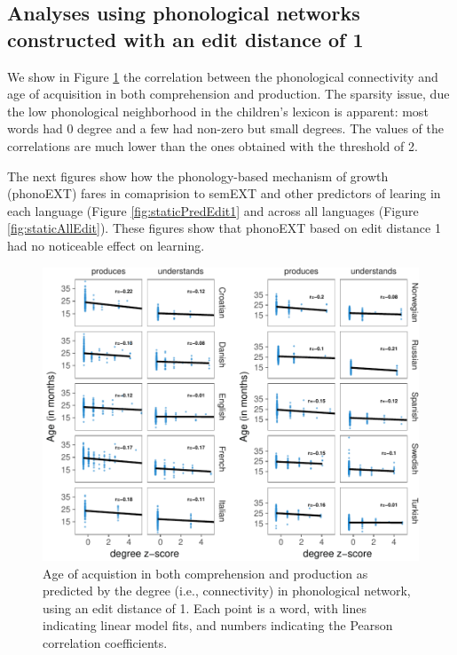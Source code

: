 \documentclass[english,floatsintext,man]{apa6}
\theoremstyle{definition}
\theoremstyle{definition}
\theoremstyle{definition}
\theoremstyle{remark}
\begin{document}
\subsection{Analyses using phonological networks constructed with an
edit distance of
1}\label{analyses-using-phonological-networks-constructed-with-an-edit-distance-of-1}

We show in Figure \ref{fig:corrPlot} the correlation between the
phonological connectivity and age of acquisition in both comprehension
and production. The sparsity issue, due the low phonological
neighborhood in the children's lexicon is apparent: most words had 0
degree and a few had non-zero but small degrees. The values of the
correlations are much lower than the ones obtained with the threshold of
2.

The next figures show how the phonology-based mechanism of growth
(phonoEXT) fares in comaprision to semEXT and other predictors of
learing in each language (Figure \ref{fig:staticPredEdit1} and across
all languages (Figure \ref{fig:staticAllEdit}). These figures show that
phonoEXT based on edit distance 1 had no noticeable effect on learning.

\begin{figure}[!h]
\includegraphics[width=\textwidth]{ms_files/figure-latex/corrPlot-1} \caption{Age of acquistion in both comprehension and production as predicted by the degree (i.e., connectivity) in phonological network, using an edit distance of 1. Each point is a word, with lines indicating linear model fits, and numbers indicating the Pearson correlation coefficients.}\label{fig:corrPlot}
\end{figure}
\end{document}
